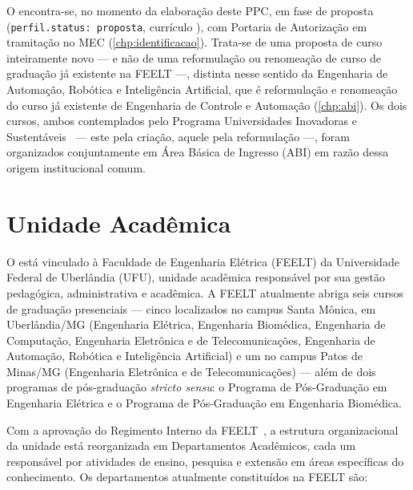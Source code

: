 O \ppccurso encontra-se, no momento da elaboração deste PPC, em fase de proposta (\texttt{perfil.status: proposta}, currículo \ppcversao), com Portaria de Autorização em tramitação no MEC (\autoref{chp:identificacao}). Trata-se de uma proposta de curso inteiramente novo — e não de uma reformulação ou renomeação de curso de graduação já existente na FEELT —, distinta nesse sentido da Engenharia de Automação, Robótica e Inteligência Artificial, que é reformulação e renomeação do curso já existente de Engenharia de Controle e Automação (\autoref{chp:abi}). Os dois cursos, ambos contemplados pelo Programa Universidades Inovadoras e Sustentáveis~\cite{programa_universidades_inovadoras_sustentaveis} — este pela criação, aquele pela reformulação —, foram organizados conjuntamente em Área Básica de Ingresso (ABI) em razão dessa origem institucional comum.


\section{Unidade Acadêmica}

O \ppccurso está vinculado à Faculdade de Engenharia Elétrica (FEELT) da Universidade Federal de Uberlândia (UFU), unidade acadêmica responsável por sua gestão pedagógica, administrativa e acadêmica. A FEELT atualmente abriga seis cursos de graduação presenciais — cinco localizados no campus Santa Mônica, em Uberlândia/MG (Engenharia Elétrica, Engenharia Biomédica, Engenharia de Computação, Engenharia Eletrônica e de Telecomunicações, Engenharia de Automação, Robótica e Inteligência Artificial) e um no campus Patos de Minas/MG (Engenharia Eletrônica e de Telecomunicações) — além de dois programas de pós-graduação \textit{stricto sensu}: o Programa de Pós-Graduação em Engenharia Elétrica e o Programa de Pós-Graduação em Engenharia Biomédica.

Com a aprovação do Regimento Interno da FEELT~\cite{ufu_feelt_regimento_2023}, a estrutura organizacional da unidade está reorganizada em Departamentos Acadêmicos, cada um responsável por atividades de ensino, pesquisa e extensão em áreas específicas do conhecimento. Os departamentos atualmente constituídos na FEELT são:

